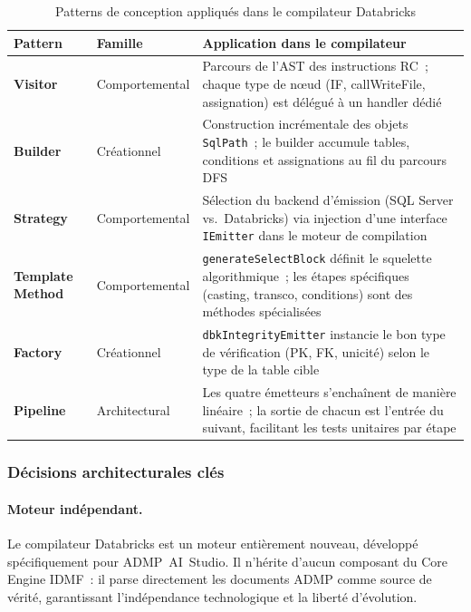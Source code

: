 \begin{table}[H]
\centering
\caption{Patterns de conception appliqués dans le compilateur Databricks}
\label{tab:patterns}
\begin{tabularx}{\textwidth}{llX}
\toprule
\textbf{Pattern} & \textbf{Famille} & \textbf{Application dans le compilateur} \\
\midrule
\textbf{Visitor} & Comportemental &
  Parcours de l'AST des instructions RC~; chaque type de nœud (IF, callWriteFile, assignation) est délégué à un handler dédié \\
\addlinespace
\textbf{Builder} & Créationnel &
  Construction incrémentale des objets \texttt{SqlPath}~; le builder accumule tables, conditions et assignations au fil du parcours DFS \\
\addlinespace
\textbf{Strategy} & Comportemental &
  Sélection du backend d'émission (SQL Server vs.\ Databricks) via injection d'une interface \texttt{IEmitter} dans le moteur de compilation \\
\addlinespace
\textbf{Template Method} & Comportemental &
  \texttt{generateSelectBlock} définit le squelette algorithmique~; les étapes spécifiques (casting, transco, conditions) sont des méthodes spécialisées \\
\addlinespace
\textbf{Factory} & Créationnel &
  \texttt{dbkIntegrityEmitter} instancie le bon type de vérification (PK, FK, unicité) selon le type de la table cible \\
\addlinespace
\textbf{Pipeline} & Architectural &
  Les quatre émetteurs s'enchaînent de manière linéaire~; la sortie de chacun est l'entrée du suivant, facilitant les tests unitaires par étape \\
\bottomrule
\end{tabularx}
\end{table}

\subsubsection*{Décisions architecturales clés}

\paragraph{Moteur indépendant.}
Le compilateur Databricks est un moteur entièrement nouveau, développé spécifiquement pour ADMP~AI~Studio. Il n'hérite d'aucun composant du Core Engine IDMF~: il parse directement les documents ADMP comme source de vérité, garantissant l'indépendance technologique et la liberté d'évolution.

